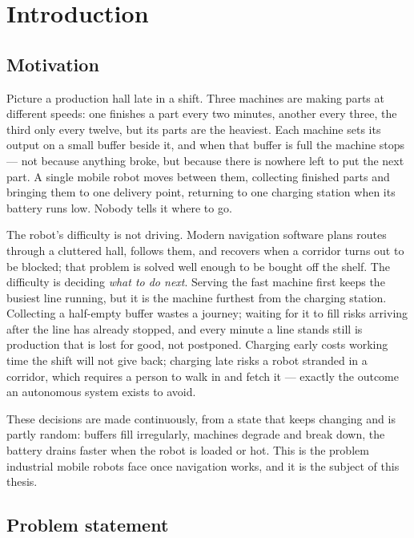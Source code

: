 \chapter{Introduction}
\label{ch:introduction}

\section{Motivation}
\label{sec:motivation}

Picture a production hall late in a shift. Three machines are making parts at different speeds:
one finishes a part every two minutes, another every three, the third only every twelve, but its
parts are the heaviest. Each machine sets its output on a small buffer beside it, and when that
buffer is full the machine stops --- not because anything broke, but because there is nowhere left
to put the next part. A single mobile robot moves between them, collecting finished parts and
bringing them to one delivery point, returning to one charging station when its battery runs low.
Nobody tells it where to go.

The robot's difficulty is not driving. Modern navigation software plans routes through a cluttered
hall, follows them, and recovers when a corridor turns out to be blocked; that problem is solved
well enough to be bought off the shelf. The difficulty is deciding \emph{what to do next}. Serving
the fast machine first keeps the busiest line running, but it is the machine furthest from the
charging station. Collecting a half-empty buffer wastes a journey; waiting for it to fill risks
arriving after the line has already stopped, and every minute a line stands still is production
that is lost for good, not postponed. Charging early costs working time the shift will not give
back; charging late risks a robot stranded in a corridor, which requires a person to walk in and
fetch it --- exactly the outcome an autonomous system exists to avoid.

These decisions are made continuously, from a state that keeps changing and is partly random:
buffers fill irregularly, machines degrade and break down, the battery drains faster when the robot
is loaded or hot. This is the problem industrial mobile robots face once navigation works, and it
is the subject of this thesis.

\section{Problem statement}
\label{sec:problem-statement}

